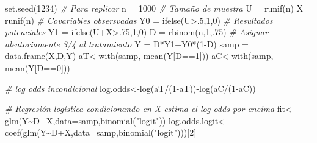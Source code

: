 \documentclass[
]{article}
\newenvironment{Shaded}{\begin{snugshade}}{\end{snugshade}}
\newcommand{\AttributeTok}[1]{\textcolor[rgb]{0.77,0.63,0.00}{#1}}
\newcommand{\CommentTok}[1]{\textcolor[rgb]{0.56,0.35,0.01}{\textit{#1}}}
\newcommand{\DecValTok}[1]{\textcolor[rgb]{0.00,0.00,0.81}{#1}}
\newcommand{\FunctionTok}[1]{\textcolor[rgb]{0.00,0.00,0.00}{#1}}
\newcommand{\NormalTok}[1]{#1}
\newcommand{\OtherTok}[1]{\textcolor[rgb]{0.56,0.35,0.01}{#1}}
\newcommand{\SpecialCharTok}[1]{\textcolor[rgb]{0.00,0.00,0.00}{#1}}
\newcommand{\StringTok}[1]{\textcolor[rgb]{0.31,0.60,0.02}{#1}}
\begin{document}
\begin{Shaded}
\begin{Highlighting}[]
\FunctionTok{set.seed}\NormalTok{(}\DecValTok{1234}\NormalTok{) }\CommentTok{\# Para replicar }
\NormalTok{n }\OtherTok{=} \DecValTok{1000} \CommentTok{\# Tamaño de muestra}
\NormalTok{U }\OtherTok{=} \FunctionTok{runif}\NormalTok{(n) }
\NormalTok{X }\OtherTok{=} \FunctionTok{runif}\NormalTok{(n) }\CommentTok{\# Covariables obsersvadas}
\NormalTok{Y0 }\OtherTok{=} \FunctionTok{ifelse}\NormalTok{(U}\SpecialCharTok{\textgreater{}}\NormalTok{.}\DecValTok{5}\NormalTok{,}\DecValTok{1}\NormalTok{,}\DecValTok{0}\NormalTok{) }\CommentTok{\# Resultados potenciales}
\NormalTok{Y1 }\OtherTok{=} \FunctionTok{ifelse}\NormalTok{(U}\SpecialCharTok{+}\NormalTok{X}\SpecialCharTok{\textgreater{}}\NormalTok{.}\DecValTok{75}\NormalTok{,}\DecValTok{1}\NormalTok{,}\DecValTok{0}\NormalTok{) }
\NormalTok{D }\OtherTok{=} \FunctionTok{rbinom}\NormalTok{(n,}\DecValTok{1}\NormalTok{,.}\DecValTok{75}\NormalTok{) }\CommentTok{\# Asignar aleatoriamente 3/4 al tratamiento }
\NormalTok{Y }\OtherTok{=}\NormalTok{ D}\SpecialCharTok{*}\NormalTok{Y1}\SpecialCharTok{+}\NormalTok{Y0}\SpecialCharTok{*}\NormalTok{(}\DecValTok{1}\SpecialCharTok{{-}}\NormalTok{D) }
\NormalTok{samp }\OtherTok{=} \FunctionTok{data.frame}\NormalTok{(X,D,Y) }
\NormalTok{aT}\OtherTok{\textless{}{-}}\FunctionTok{with}\NormalTok{(samp, }\FunctionTok{mean}\NormalTok{(Y[D}\SpecialCharTok{==}\DecValTok{1}\NormalTok{])) }
\NormalTok{aC}\OtherTok{\textless{}{-}}\FunctionTok{with}\NormalTok{(samp, }\FunctionTok{mean}\NormalTok{(Y[D}\SpecialCharTok{==}\DecValTok{0}\NormalTok{])) }

\CommentTok{\# log odds incondicional}
\NormalTok{log.odds}\OtherTok{\textless{}{-}}\FunctionTok{log}\NormalTok{(aT}\SpecialCharTok{/}\NormalTok{(}\DecValTok{1}\SpecialCharTok{{-}}\NormalTok{aT))}\SpecialCharTok{{-}}\FunctionTok{log}\NormalTok{(aC}\SpecialCharTok{/}\NormalTok{(}\DecValTok{1}\SpecialCharTok{{-}}\NormalTok{aC)) }

\CommentTok{\# Regresión logística condicionando en X estima el log odds por encima}
\NormalTok{fit}\OtherTok{\textless{}{-}}\FunctionTok{glm}\NormalTok{(Y}\SpecialCharTok{\textasciitilde{}}\NormalTok{D}\SpecialCharTok{+}\NormalTok{X,}\AttributeTok{data=}\NormalTok{samp,}\FunctionTok{binomial}\NormalTok{(}\StringTok{"logit"}\NormalTok{)) }
\NormalTok{log.odds.logit}\OtherTok{\textless{}{-}}
  \FunctionTok{coef}\NormalTok{(}\FunctionTok{glm}\NormalTok{(Y}\SpecialCharTok{\textasciitilde{}}\NormalTok{D}\SpecialCharTok{+}\NormalTok{X,}\AttributeTok{data=}\NormalTok{samp,}\FunctionTok{binomial}\NormalTok{(}\StringTok{"logit"}\NormalTok{)))[}\DecValTok{2}\NormalTok{] }


\end{Highlighting}
\end{Shaded}
\end{document}
